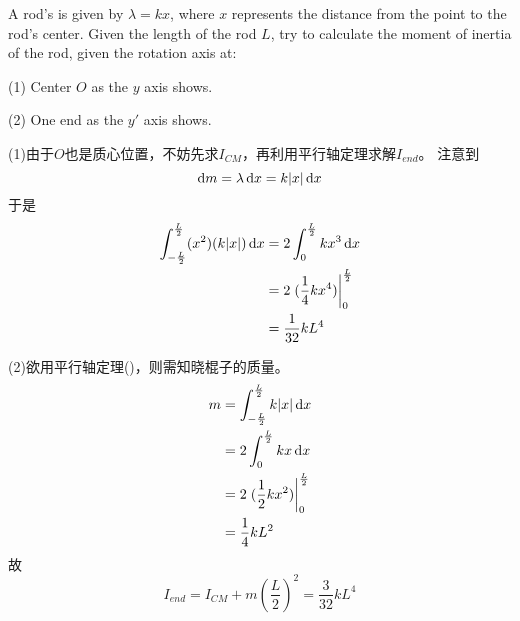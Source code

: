 \begin{solution}
	A rod's  is given by $\lambda=kx$, where $x$ represents the distance from the point to the rod's center. 
	Given the length of the rod $L$, try to calculate the moment of inertia of the rod, given the rotation axis at:
	
	(1) Center $O$ as the $y$ axis shows.
	
	(2) One end as the $y'$ axis shows.
	
	\tcbrule
	
	(1)由于$O$也是质心位置，不妨先求$I_{CM}$，再利用平行轴定理求解$I_{end}$。
	注意到
	\[\dif m=\lambda\dif x=k|x|\dif x\]
	于是
	\begin{align*}
		\int_{-\frac{L}{2}}^{\frac{L}{2}}(x^2)(k|x|)\dif x&=2\int_0^{\frac{L}{2}}kx^3\dif x\\
		&=2\left.(\dfrac{1}{4}kx^4)\right|_0^{\frac{L}{2}}\\
		&=\dfrac{1}{32}kL^4
	\end{align*}
	
	(2)欲用平行轴定理()，则需知晓棍子的质量。
	\begin{align*}
		m&=\int_{-\frac{L}{2}}^{\frac{L}{2}}k|x|\dif x\\
		&=2\int_0^{\frac{L}{2}}kx\dif x\\
		&=2\left.(\dfrac{1}{2}kx^2)\right|_0^{\frac{L}{2}}\\
		&=\dfrac{1}{4}kL^2
	\end{align*}
	故
	\[I_{end}=I_{CM}+m(\dfrac{L}{2})^2=\dfrac{3}{32}kL^4\]
\end{solution}
